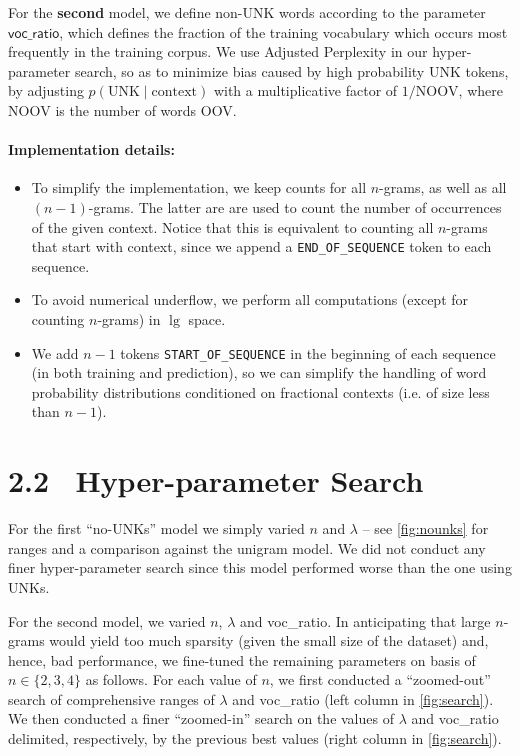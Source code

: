\documentclass[11pt]{article}
\begin{document}
For the \textbf{second} model, we define non-UNK words according to the parameter $\textsf{voc\_ratio}$, which defines the fraction of the training vocabulary which occurs most frequently in the training corpus. We use Adjusted Perplexity in our hyper-parameter search, so as to minimize bias caused by high probability UNK tokens, by adjusting $p(\mathrm{UNK}\mid \mathrm{context})$ with a multiplicative factor of $1/\mathrm{NOOV}$, where $\mathrm{NOOV}$ is the number of words OOV. 


\paragraph{Implementation details: }

\begin{itemize}
  \item To simplify the implementation, we keep counts for all $n$-grams, as well as all $(n-1)$-grams. The latter are are used to count the number of occurrences of the given \textsf{context}. Notice that this is equivalent to counting all $n$-grams that start with \textsf{context}, since we append a \texttt{END\_OF\_SEQUENCE} token to each sequence.
  \item To avoid numerical underflow, we perform all computations (except for counting $n$-grams) in $\lg$ space.
  \item We add $n-1$ tokens \texttt{START\_OF\_SEQUENCE} in the beginning of each sequence (in both training and prediction), so we can simplify the handling of word probability distributions conditioned on fractional contexts (i.e. of size less than $n-1$).
\end{itemize}


\section*{2.2$\;\;$ Hyper-parameter Search}\label{sec:search}

For the first ``no-UNKs'' model we simply varied $n$ and $\lambda$ -- see \cref{fig:nounks} for ranges and a comparison against the unigram model. We did not conduct any finer hyper-parameter search since this model performed worse than the one using UNKs.

For the second model, we varied $n$, $\lambda$ and \textsf{voc\_ratio}. In anticipating that large $n$-grams would yield too much sparsity (given the small size of the dataset) and, hence, bad performance, we fine-tuned the remaining parameters on basis of $n\in\{2,3,4\}$ as follows. For each value of $n$, we first conducted a ``zoomed-out'' search of comprehensive ranges of $\lambda$ and \textsf{voc\_ratio} (left column in \cref{fig:search}). We then conducted a finer ``zoomed-in'' search on the values of $\lambda$ and \textsf{voc\_ratio} delimited, respectively, by the previous best values (right column in \cref{fig:search}).
\end{document}

